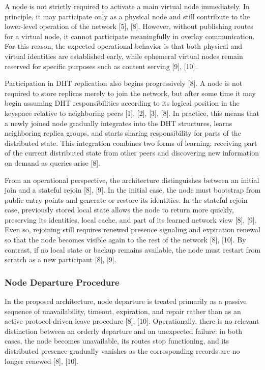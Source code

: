 \documentclass[12pt,a4paper]{article}
\begin{document}
A node is not strictly required to activate a main virtual node immediately. In principle, it may participate only as a physical node and still contribute to the lower-level operation of the network [5], [8]. However, without publishing routes for a virtual node, it cannot participate meaningfully in overlay communication. For this reason, the expected operational behavior is that both physical and virtual identities are established early, while ephemeral virtual nodes remain reserved for specific purposes such as content serving [9], [10].

Participation in DHT replication also begins progressively [8]. A node is not required to store replicas merely to join the network, but after some time it may begin assuming DHT responsibilities according to its logical position in the keyspace relative to neighboring peers [1], [2], [3], [8]. In practice, this means that a newly joined node gradually integrates into the DHT structures, learns neighboring replica groups, and starts sharing responsibility for parts of the distributed state. This integration combines two forms of learning: receiving part of the current distributed state from other peers and discovering new information on demand as queries arise [8].

From an operational perspective, the architecture distinguishes between an initial join and a stateful rejoin [8], [9]. In the initial case, the node must bootstrap from public entry points and generate or restore its identities. In the stateful rejoin case, previously stored local state allows the node to return more quickly, preserving its identities, local cache, and part of its learned network view [8], [9]. Even so, rejoining still requires renewed presence signaling and expiration renewal so that the node becomes visible again to the rest of the network [8], [10]. By contrast, if no local state or backup remains available, the node must restart from scratch as a new participant [8], [9].

\subsubsection{Node Departure Procedure}

In the proposed architecture, node departure is treated primarily as a passive sequence of unavailability, timeout, expiration, and repair rather than as an active protocol-driven leave procedure [8], [10]. Operationally, there is no relevant distinction between an orderly departure and an unexpected failure: in both cases, the node becomes unavailable, its routes stop functioning, and its distributed presence gradually vanishes as the corresponding records are no longer renewed [8], [10].
\end{document}
